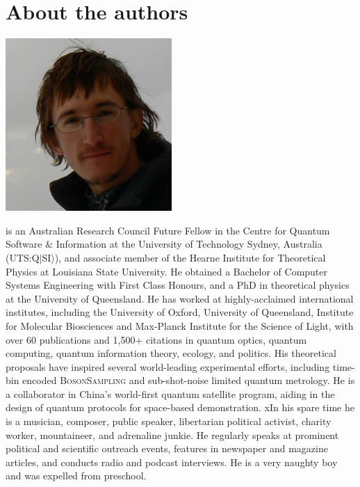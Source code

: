 %
%

\section*{About the authors}

%
%

\begin{center}
\includegraphics[clip=true, width=0.475\textwidth]{photo_peter_rohde}
\end{center}

 is an Australian Research Council Future Fellow in the Centre for Quantum Software \& Information at the University of Technology Sydney, Australia (UTS:Q$|$SI$\rangle$), and associate member of the Hearne Institute for Theoretical Physics at Louisiana State University. He obtained a Bachelor of Computer Systems Engineering with First Class Honours, and a PhD in theoretical physics at the University of Queensland. He has worked at highly-acclaimed international institutes, including the University of Oxford, University of Queensland, Institute for Molecular Biosciences and Max-Planck Institute for the Science of Light, with over 60 publications and 1,500+ citations in quantum optics, quantum computing, quantum information theory, ecology, and politics. His theoretical proposals have inspired several world-leading experimental efforts, including time-bin encoded \textsc{BosonSampling} and sub-shot-noise limited quantum metrology. He is a collaborator in China's world-first quantum satellite program, aiding in the design of quantum protocols for space-based demonstration. xIn his spare time he is a musician, composer, public speaker, libertarian political activist, charity worker, mountaineer, and adrenaline junkie. He regularly speaks at prominent political and scientific outreach events, features in newspaper and magazine articles, and conducts radio and podcast interviews. He is a very naughty boy and was expelled from preschool.


